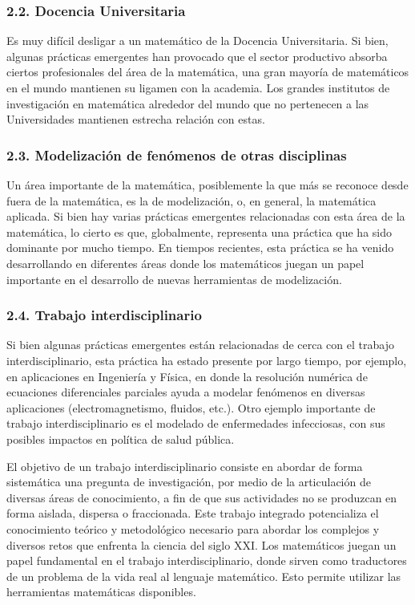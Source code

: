 \subsubsection*{2.2. Docencia Universitaria }


Es muy difícil desligar a un matemático de la Docencia Universitaria. Si bien, algunas prácticas emergentes han provocado que el sector productivo absorba ciertos profesionales del área de la matemática, una gran mayoría de matemáticos en el mundo mantienen su ligamen con la academia. Los grandes institutos de investigación en matemática alrededor del mundo que no pertenecen a las Universidades mantienen estrecha relación con estas.

\subsubsection*{2.3. Modelización de fenómenos de otras disciplinas}

Un área importante de la matemática, posiblemente la que más se reconoce desde fuera de la matemática, es la de modelización, o, en general, la matemática aplicada. Si bien hay varias prácticas emergentes relacionadas con esta área de la matemática, lo cierto es que, globalmente, representa una práctica que ha sido dominante por mucho tiempo. En tiempos recientes, esta práctica se ha venido desarrollando en diferentes áreas donde los matemáticos juegan un papel importante en el desarrollo de nuevas herramientas de modelización. 

\subsubsection*{2.4. Trabajo interdisciplinario}


Si bien algunas prácticas emergentes están relacionadas de cerca con el trabajo interdisciplinario, esta práctica ha estado presente por largo tiempo, por ejemplo, en aplicaciones en Ingeniería y Física, en donde la resolución numérica de ecuaciones diferenciales parciales ayuda a modelar fenómenos en diversas aplicaciones (electromagnetismo, fluidos, etc.). Otro ejemplo importante de trabajo interdisciplinario es el modelado de enfermedades infecciosas, con sus posibles impactos en política de salud pública. 

El objetivo de un trabajo interdisciplinario consiste en abordar de forma sistemática una pregunta de investigación, por medio de la articulación de diversas áreas de conocimiento, a fin de que sus actividades no se produzcan en forma aislada, dispersa o fraccionada. Este trabajo integrado potencializa el conocimiento teórico y metodológico necesario para abordar los complejos y diversos retos que enfrenta la ciencia del siglo XXI. Los matemáticos juegan un papel fundamental en el trabajo interdisciplinario, donde sirven como traductores de un problema de la vida real al lenguaje matemático. Esto permite utilizar las herramientas matemáticas disponibles. 

